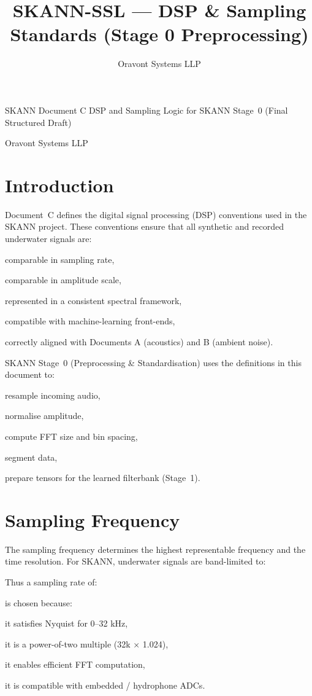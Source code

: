 \documentclass[12pt]{article}
\begin{document}
\title{SKANN-SSL --- DSP \& Sampling Standards (Stage 0 Preprocessing)}
\author{Oravont Systems LLP}
\date{}
\maketitle

SKANN Document C
DSP and Sampling Logic for SKANN Stage 0
(Final Structured Draft)

Oravont Systems LLP

\section*{Introduction}
Document C defines the digital signal processing (DSP) conventions used in the SKANN project. These conventions ensure that all synthetic and recorded underwater signals are:

comparable in sampling rate,

comparable in amplitude scale,

represented in a consistent spectral framework,

compatible with machine-learning front-ends,

correctly aligned with Documents A (acoustics) and B (ambient noise).

SKANN Stage 0 (Preprocessing \& Standardisation) uses the definitions in this document to:

resample incoming audio,

normalise amplitude,

compute FFT size and bin spacing,

segment data,

prepare tensors for the learned filterbank (Stage 1).

\section*{Sampling Frequency}
The sampling frequency  determines the highest representable frequency and the time resolution. For SKANN, underwater signals are band-limited to:


Thus a sampling rate of:


is chosen because:

it satisfies Nyquist for 0–32 kHz,

it is a power-of-two multiple (32k × 1.024),

it enables efficient FFT computation,

it is compatible with embedded / hydrophone ADCs.
\end{document}
